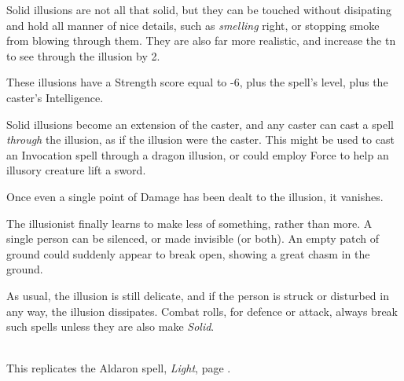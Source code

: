 \begin{multicols}{2}
Solid illusions are not all that solid, but they can be touched without disipating and hold all manner of nice details, such as \emph{smelling} right, or stopping smoke from blowing through them.  They are also far more realistic, and increase the \gls{tn} to see through the illusion by 2.

These illusions have a Strength score equal to -6, plus the spell's level, plus the caster's Intelligence.

Solid illusions become an extension of the caster, and any caster can cast a spell \textit{through} the illusion, as if the illusion were the caster.  This might be used to cast an Invocation spell through a dragon illusion, or could employ Force to help an illusory creature lift a sword.

Once even a single point of Damage has been dealt to the illusion, it vanishes.


The illusionist finally learns to make less of something, rather than more.  A single person can be silenced, or made invisible (or both).
An empty patch of ground could suddenly appear to break open, showing a great chasm in the ground.

As usual, the illusion is still delicate, and if the person is struck or disturbed in any way, the illusion dissipates.  Combat rolls, for defence or attack, always break such spells unless they are also make \textit{Solid}.

\\
This replicates the Aldaron spell, \textit{Light}, page \pageref{light}.

\end{multicols}



